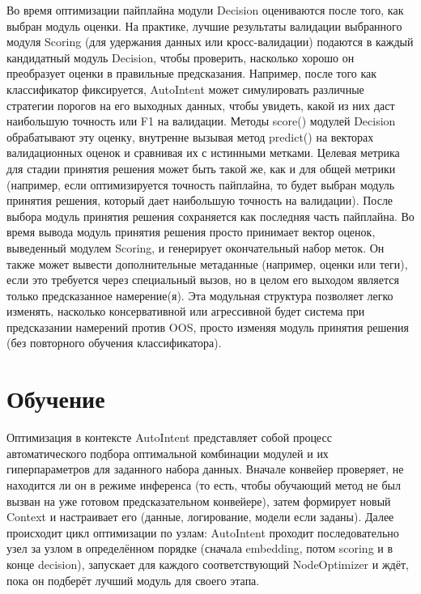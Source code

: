 \documentclass[14pt,a4paper,oneside,openany]{extbook}
\begin{document}
Во время оптимизации пайплайна модули Decision оцениваются после того, как выбран модуль оценки. На практике, лучшие результаты валидации выбранного модуля Scoring (для удержания данных или кросс-валидации) подаются в каждый кандидатный модуль Decision, чтобы проверить, насколько хорошо он преобразует оценки в правильные предсказания. Например, после того как классификатор фиксируется, AutoIntent может симулировать различные стратегии порогов на его выходных данных, чтобы увидеть, какой из них даст наибольшую точность или F1 на валидации. Методы score() модулей Decision обрабатывают эту оценку, внутренне вызывая метод predict() на векторах валидационных оценок и сравнивая их с истинными метками. Целевая метрика для стадии принятия решения может быть такой же, как и для общей метрики (например, если оптимизируется точность пайплайна, то будет выбран модуль принятия решения, который дает наибольшую точность на валидации). После выбора модуль принятия решения сохраняется как последняя часть пайплайна. Во время вывода модуль принятия решения просто принимает вектор оценок, выведенный модулем Scoring, и генерирует окончательный набор меток. Он также может вывести дополнительные метаданные (например, оценки или теги), если это требуется через специальный вызов, но в целом его выходом является только предсказанное намерение(я). Эта модульная структура позволяет легко изменять, насколько консервативной или агрессивной будет система при предсказании намерений против OOS, просто изменяя модуль принятия решения (без повторного обучения классификатора).
\section{Обучение}
\label{sec:org0c563d0}
Оптимизация в контексте AutoIntent представляет собой процесс автоматического подбора оптимальной комбинации модулей и их гиперпараметров для заданного набора данных. Вначале конвейер проверяет, не находится ли он в режиме инференса (то есть, чтобы обучающий метод не был вызван на уже готовом предсказательном конвейере), затем формирует новый Context и настраивает его (данные, логирование, модели если заданы). Далее происходит цикл оптимизации по узлам: AutoIntent проходит последовательно узел за узлом в определённом порядке (сначала embedding, потом scoring и в конце decision), запускает для каждого соответствующий NodeOptimizer и ждёт, пока он подберёт лучший модуль для своего этапа.
\end{document}
